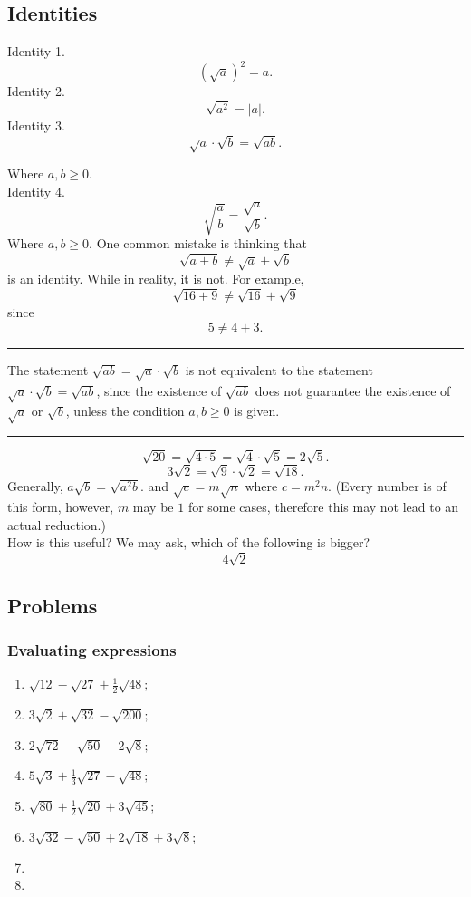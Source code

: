 \documentclass{article}
\begin{document}
\subsection{Identities}
Identity 1.
\[
    (\sqrt{a})^2 = a.
\]
Identity 2.
\[
    \sqrt{a^2} = |a|.
\]
Identity 3.
\[
    \sqrt{a} \cdot \sqrt{b} = \sqrt{ab}.
\]

Where $a, b \ge 0.$\\
Identity 4.
\[
    \sqrt{\frac{a}{b}} = \frac{\sqrt{a}}{\sqrt{b}}.
\]
Where $a, b \ge 0.$
One common mistake is thinking that
\[
    \sqrt{a + b} \not= \sqrt{a} + \sqrt{b}
\]
is an identity. While in reality, it is not. For example,
\[
    \sqrt{16 + 9} \not= \sqrt{16} + \sqrt{9}
\]
since
\[
    5 \not= 4 + 3.
\]

\vspace{10pt}
\hrule
\vspace{10pt}

The statement $\sqrt{ab} = \sqrt{a} \cdot \sqrt{b}$ is not equivalent to the statement $\sqrt{a} \cdot \sqrt{b} = \sqrt{ab}$, since the existence of $\sqrt{ab}$ does not guarantee the existence of $\sqrt{a}$ or $\sqrt{b}$, unless the condition $a, b \ge 0$ is given.

\vspace{10pt}
\hrule
\vspace{10pt}

\[
\sqrt{20} = \sqrt{4\cdot5} = \sqrt{4} \cdot \sqrt{5} = 2\sqrt{5}.
\]
\[
3\sqrt{2} = \sqrt{9} \cdot \sqrt{2} = \sqrt{18}.
\]
Generally, $a\sqrt{b} = \sqrt{a^2b}.$ and $\sqrt{c} = m\sqrt{n}$ where $c = m^2n.$ (Every number is of this form, however, $m$ may be $1$ for some cases, therefore this may not lead to an actual reduction.)\\

How is this useful? We may ask, which of the following is bigger?
\[
    4\sqrt{2}  %
\]

\subsection{Problems}

\subsubsection{Evaluating expressions}
\begin{enumerate} %
    \item $\sqrt{12} - \sqrt{27} + \frac{1}{2}\sqrt{48};$
    \item $3\sqrt{2} + \sqrt{32} - \sqrt{200};$
    \item $2\sqrt{72} - \sqrt{50} - 2\sqrt{8};$
    \item $5\sqrt{3} + \frac{1}{3}\sqrt{27} - \sqrt{48};$
    \item $\sqrt{80} + \frac{1}{2}\sqrt{20} + 3\sqrt{45};$
    \item $3\sqrt{32} - \sqrt{50} + 2\sqrt{18} + 3\sqrt{8};$
    \item 
    \item 
\end{enumerate} %
\end{document}
